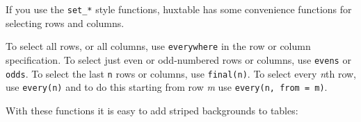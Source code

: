 \documentclass[]{article}
\newenvironment{Shaded}{\begin{snugshade}}{\end{snugshade}}
\newcommand{\DecValTok}[1]{\textcolor[rgb]{0.00,0.00,0.81}{#1}}
\newcommand{\KeywordTok}[1]{\textcolor[rgb]{0.13,0.29,0.53}{\textbf{#1}}}
\newcommand{\NormalTok}[1]{#1}
\newcommand{\OperatorTok}[1]{\textcolor[rgb]{0.81,0.36,0.00}{\textbf{#1}}}
\newcommand{\OtherTok}[1]{\textcolor[rgb]{0.56,0.35,0.01}{#1}}
\newcommand{\StringTok}[1]{\textcolor[rgb]{0.31,0.60,0.02}{#1}}
\begin{document}
If you use the \texttt{set\_*} style functions, huxtable has some
convenience functions for selecting rows and columns.

To select all rows, or all columns, use \texttt{everywhere} in the row
or column specification. To select just even or odd-numbered rows or
columns, use \texttt{evens} or \texttt{odds}. To select the last
\texttt{n} rows or columns, use \texttt{final(n)}. To select every
\emph{n}th row, use \texttt{every(n)} and to do this starting from row
\emph{m} use \texttt{every(n,\ from\ =\ m)}.

With these functions it is easy to add striped backgrounds to tables:

\begin{Shaded}
\end{Shaded}
\end{document}

